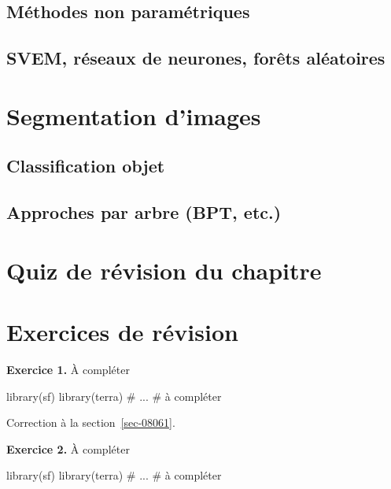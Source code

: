 \documentclass[
  letterpaper,
  DIV=11,
  numbers=noendperiod]{scrreprt}
\newenvironment{Shaded}{\begin{snugshade}}{\end{snugshade}}
\newcommand{\CommentTok}[1]{\textcolor[rgb]{0.37,0.37,0.37}{#1}}
\newcommand{\NormalTok}[1]{\textcolor[rgb]{0.00,0.23,0.31}{#1}}
\begin{document}
\subsection{Méthodes non paramétriques}\label{sec-0513}

\subsection{SVEM, réseaux de neurones, forêts
aléatoires}\label{sec-0514}

\section{Segmentation d'images}\label{sec-052}

\subsection{Classification objet}\label{sec-0521}

\subsection{Approches par arbre (BPT, etc.)}\label{sec-0522}

\section{Quiz de révision du chapitre}\label{sec-053}

\section{Exercices de révision}\label{sec-054}

\textbf{Exercice 1.} À compléter

\begin{Shaded}
\begin{Highlighting}[]
\NormalTok{library(sf)}
\NormalTok{library(terra)}
\CommentTok{\# ...}
\CommentTok{\# à compléter}
\end{Highlighting}
\end{Shaded}

Correction à la section~\ref{sec-08061}.

\textbf{Exercice 2.} À compléter

\begin{Shaded}
\begin{Highlighting}[]
\NormalTok{library(sf)}
\NormalTok{library(terra)}
\CommentTok{\# ...}
\CommentTok{\# à compléter}
\end{Highlighting}
\end{Shaded}
\end{document}
